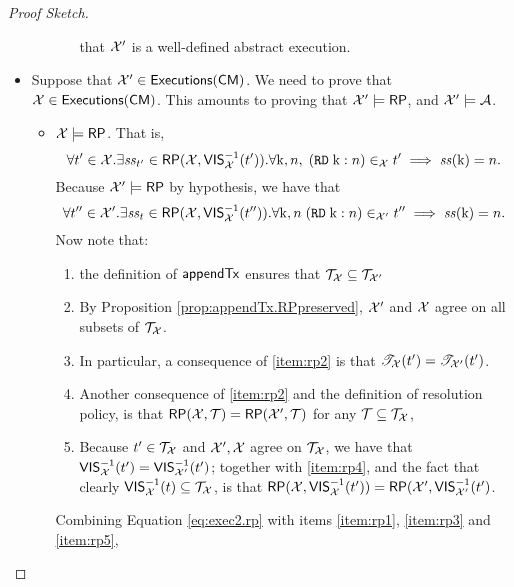 \begin{proof}[Proof Sketch]
\begin{itemize}
\begin{itemize}
\begin{itemize}
			that $\mathcal{X}'$ is a well-defined abstract execution.
		\end{itemize}
	\end{itemize}
	\item Suppose that $\mathcal{X}' \in {\mathsf{Executions}}(\mathsf{CM})$. We need to prove that $\mathcal{X} \in {\mathsf{Executions}}(\mathsf{CM})$. 
	This amounts to proving that $\mathcal{X}' \models \mathsf{RP}$, and $\mathcal{X}' \models \mathcal{A}$. 
	\begin{itemize}
		\item $\mathcal{X} \models \mathsf{RP}$. That is, 
		\begin{equation}
		\label{eq:aexec1.rp}
		\forall t' \in \mathcal{X}. \exists \mathit{ss}_{t'} \in \mathsf{RP}(\mathcal{X}, {\mathsf{VIS}}^{-1}_{\mathcal{X}}(t')). \forall \mathrm{k},n,\; ({{\tt RD}}\;\mathrm{k}:n) \in_{\mathcal{X}} t' \implies \mathit{ss}(\mathrm{k}) = n.
		\end{equation}
		Because $\mathcal{X}' \models \mathsf{RP}$ by hypothesis, we have that 
		\begin{equation}
		\label{eq:exec2.rp}
		\forall t'' \in \mathcal{X}'. \exists \mathit{ss}_{t} \in \mathsf{RP}(\mathcal{X}, {\mathsf{VIS}}^{-1}_{\mathcal{X}}(t'')).\forall \mathrm{k},n\; ({{\tt RD}}\;\mathrm{k}: n) \in_{\mathcal{X}'} t'' \implies \mathit{ss}(\mathrm{k}) = n.
		\end{equation}
		Now note that:
		\begin{enumerate}
			\item\label{item:rp1} the definition of $\mathsf{appendTx}$ ensures that $\mathcal{T}_{\mathcal{X}} \subseteq \mathcal{T}_{\mathcal{X}'}$
			\item\label{item:rp2} By Proposition \ref{prop:appendTx.RPpreserved}, $\mathcal{X}'$ and $\mathcal{X}$ agree on all subsets of $\mathcal{T}_{\mathcal{X}}$. 
			\item\label{item:rp3} In particular, a consequence of \eqref{item:rp2} is that $\mathscr{T}_{\mathcal{X}}(t') = \mathscr{T}_{\mathcal{X}'}(t')$. 
			\item\label{item:rp4} Another consequence of \eqref{item:rp2} and the definition of resolution policy, is that 
			$\mathsf{RP}(\mathcal{X}, \mathcal{T}) = \mathsf{RP}(\mathcal{X}', \mathcal{T})$ for any $\mathcal{T} \subseteq \mathcal{T}_{\mathcal{X}}$, 
			\item\label{item:rp5} Because $t' \in \mathcal{T}_{\mathcal{X}}$ and $\mathcal{X}', \mathcal{X}$ agree on $\mathcal{T}_{\mathcal{X}}$, we have that 
		${\mathsf{VIS}}^{-1}_{\mathcal{X}}(t') = {\mathsf{VIS}}^{-1}_{\mathcal{X}'}(t')$; together with \eqref{item:rp4}, and the fact that clearly 
		${\mathsf{VIS}}^{-1}_{\mathcal{X}}(t) \subseteq \mathcal{T}_{\mathcal{X}}$, is that $\mathsf{RP}(\mathcal{X}, {\mathsf{VIS}}_{\mathcal{X}}^{-1}(t')) = \mathsf{RP}(\mathcal{X}', {\mathsf{VIS}}_{\mathcal{X}'}^{-1}(t')$.
		\end{enumerate}
		Combining Equation \eqref{eq:exec2.rp} with items \eqref{item:rp1}, \eqref{item:rp3} and \eqref{item:rp5}, 

\end{itemize}
\end{itemize}
\end{proof}

